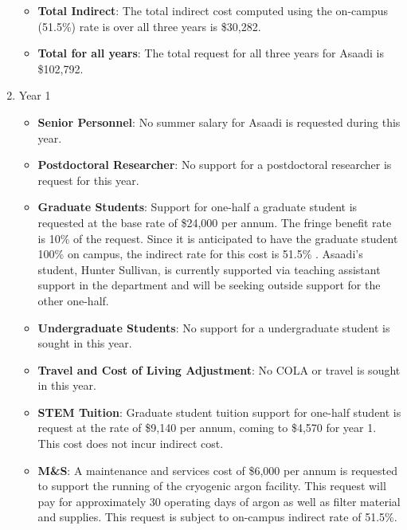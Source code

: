 \begin{enumerate}
\begin{itemize}[noitemsep,nolistsep]
\item {{\bf Total Indirect}: The total indirect cost computed using the on-campus (51.5\%) rate is over all three years is \$30,282.}

\item {{\bf Total for all years}: The total request for all three years for Asaadi is \$102,792.}

\end{itemize}



\item{Year 1}

\begin{itemize}[noitemsep,nolistsep]

\item{{\bf Senior Personnel}: No summer salary for Asaadi is requested during this year.}

\item {{\bf Postdoctoral Researcher}: No support for a postdoctoral researcher is request for this year.} 

\item{{\bf Graduate Students}: Support for one-half a graduate student is requested at the base rate of \$24,000 per annum.   The fringe benefit rate is 10\% of the request.  Since it is anticipated to have the graduate student 100\% on campus, the indirect rate for this cost is 51.5\% .   Asaadi’s student, Hunter Sullivan, is currently supported via teaching assistant support in the department and will be seeking outside support for the other one-half.}

\item {{\bf Undergraduate Students}: No support for a undergraduate student is sought in this year.}

\item{{\bf Travel and Cost of Living Adjustment}: No COLA or travel is sought in this year.}

\item {{\bf STEM Tuition}: Graduate student tuition support for one-half student is request at the rate of \$9,140 per annum, coming to \$4,570 for year 1.  This cost does not incur indirect cost.}

\item {{\bf M\&S}: A maintenance and services cost of \$6,000 per annum is requested to support the running of the cryogenic argon facility. This request will pay for approximately 30 operating days of argon as well as filter material and supplies.  This request is subject to on-campus indirect rate of 51.5\%.}


\end{itemize}
\end{enumerate}

